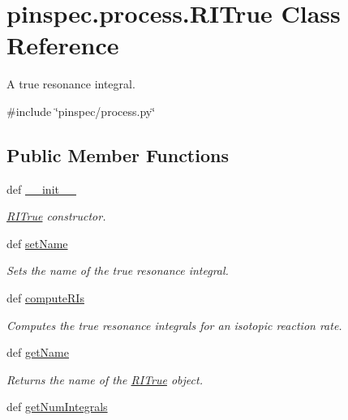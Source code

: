 \hypertarget{classpinspec_1_1process_1_1RITrue}{\section{pinspec.\-process.\-R\-I\-True Class Reference}
\label{classpinspec_1_1process_1_1RITrue}
}


A true resonance integral.  




{\ttfamily \#include \char`\"{}pinspec/process.\-py\char`\"{}}

\subsection*{Public Member Functions}
\begin{DoxyCompactItemize}
\item 
def \hyperlink{classpinspec_1_1process_1_1RITrue_ab6e86b3e2972731d8d2686e550e87ec8}{\-\_\-\-\_\-init\-\_\-\-\_\-}
\begin{DoxyCompactList}\small\item\em \hyperlink{classpinspec_1_1process_1_1RITrue}{R\-I\-True} constructor. \end{DoxyCompactList}\item 
def \hyperlink{classpinspec_1_1process_1_1RITrue_ad356c85340b6b981a9687a95aa57a375}{set\-Name}
\begin{DoxyCompactList}\small\item\em Sets the name of the true resonance integral. \end{DoxyCompactList}\item 
def \hyperlink{classpinspec_1_1process_1_1RITrue_a23b3e3deabb334457c82c7b4e29d3cf1}{compute\-R\-Is}
\begin{DoxyCompactList}\small\item\em Computes the true resonance integrals for an isotopic reaction rate. \end{DoxyCompactList}\item 
def \hyperlink{classpinspec_1_1process_1_1RITrue_aac61143b201fda62c0a9e1534716dea2}{get\-Name}
\begin{DoxyCompactList}\small\item\em Returns the name of the \hyperlink{classpinspec_1_1process_1_1RITrue}{R\-I\-True} object. \end{DoxyCompactList}\item 
def \hyperlink{classpinspec_1_1process_1_1RITrue_a53316a20b63e3576734fb91f65734e33}{get\-Num\-Integrals}

\end{DoxyCompactItemize}
